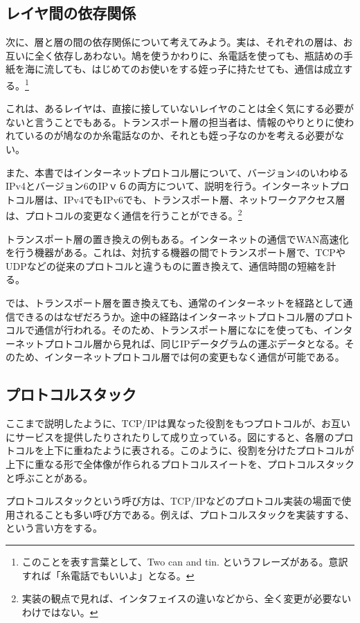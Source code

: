 \subsection{レイヤ間の依存関係}

次に、層と層の間の依存関係について考えてみよう。実は、それぞれの層は、お互いに全く依存しあわない。鳩を使うかわりに、糸電話を使っても、瓶詰めの手紙を海に流しても、はじめてのお使いをする姪っ子に持たせても、通信は成立する。\footnote{このことを表す言葉として、Two can and tin. というフレーズがある。意訳すれば「糸電話でもいいよ」となる。}

これは、あるレイヤは、直接に接していないレイヤのことは全く気にする必要がないと言うことでもある。トランスポート層の担当者は、情報のやりとりに使われているのが鳩なのか糸電話なのか、それとも姪っ子なのかを考える必要がない。

また、本書ではインターネットプロトコル層について、バージョン4のいわゆるIPv4とバージョン6のIPｖ６の両方について、説明を行う。インターネットプロトコル層は、IPv4でもIPv6でも、トランスポート層、ネットワークアクセス層は、プロトコルの変更なく通信を行うことができる。\footnote{実装の観点で見れば、インタフェイスの違いなどから、全く変更が必要ないわけではない。}

トランスポート層の置き換えの例もある。インターネットの通信でWAN高速化を行う機器がある。これは、対抗する機器の間でトランスポート層で、TCPやUDPなどの従来のプロトコルと違うものに置き換えて、通信時間の短縮を計る。

では、トランスポート層を置き換えても、通常のインターネットを経路として通信できるのはなぜだろうか。途中の経路はインターネットプロトコル層のプロトコルで通信が行われる。そのため、トランスポート層になにを使っても、インターネットプロトコル層から見れば、同じIPデータグラムの運ぶデータとなる。そのため、インターネットプロトコル層では何の変更もなく通信が可能である。

\subsection{プロトコルスタック}
ここまで説明したように、TCP/IPは異なった役割をもつプロトコルが、お互いにサービスを提供したりされたりして成り立っている。図にすると、各層のプロトコルを上下に重ねたように表される。このように、役割を分けたプロトコルが上下に重なる形で全体像が作られるプロトコルスイートを、プロトコルスタックと呼ぶことがある。

プロトコルスタックという呼び方は、TCP/IPなどのプロトコル実装の場面で使用されることも多い呼び方である。例えば、プロトコルスタックを実装すする、という言い方をする。

